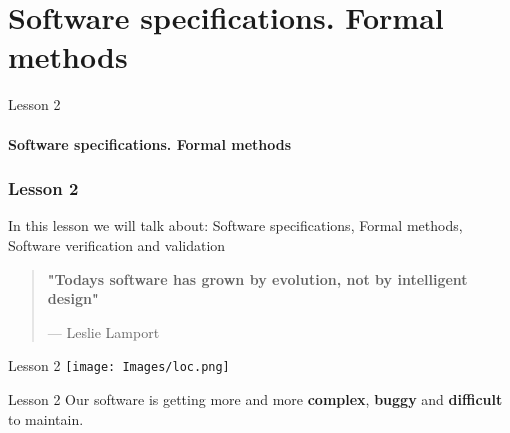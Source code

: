 \documentclass[aspectratio=1610]{beamer}
\begin{document}
\section{Software specifications. Formal methods}

\begin{frame}
\begin{center}
\Huge Lesson 2\\~\\
\textbf{Software specifications. Formal methods}
\end{center}
\end{frame}


\begin{frame}
\frametitle{Lesson 2}

\Huge In this lesson we will talk about:
 \alert{Software specifications},
 \alert{Formal methods},
 \alert{Software verification and validation}
\end{frame}



\begin{frame}
\begin{center}
\Huge
\begin{quote}
\textbf{"Todays software has grown by evolution, not by intelligent design"}
\begin{flushright}
{--- Leslie Lamport}	
\end{flushright}
\end{quote}
\end{center}
\end{frame}


\begin{frame}{Lesson 2}{}
\texttt{[image: Images/loc.png]}
\end{frame}


\begin{frame}{Lesson 2}{}
\Huge
 Our software is getting more and more \textbf{complex}, \textbf{buggy} and \textbf{difficult} to maintain.
 \end{frame}


\begin{frame}
\end{frame}

\begin{frame}
\end{frame}
\end{document}
